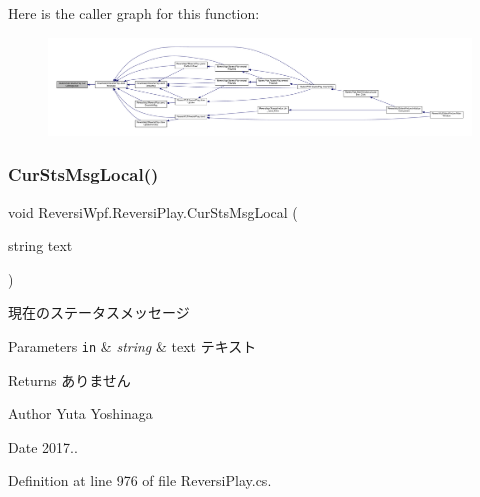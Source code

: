 Here is the caller graph for this function\+:
\nopagebreak
\begin{figure}[H]
\begin{center}
\leavevmode
\includegraphics[width=350pt]{class_reversi_wpf_1_1_reversi_play_a009e9476a5ca008b66093f78132bb096_icgraph}
\end{center}
\end{figure}
\mbox{\label{class_reversi_wpf_1_1_reversi_play_a3bf270db60f09d060120c0d85966e754}} 
\subsubsection{\texorpdfstring{Cur\+Sts\+Msg\+Local()}{CurStsMsgLocal()}}
{\footnotesize\ttfamily void Reversi\+Wpf.\+Reversi\+Play.\+Cur\+Sts\+Msg\+Local (\begin{DoxyParamCaption}\item[{string}]{text }\end{DoxyParamCaption})\hspace{0.3cm}{\ttfamily [private]}}



現在のステータスメッセージ 


\begin{DoxyParams}[1]{Parameters}
\mbox{\tt in}  & {\em string} & text テキスト \\
\hline
\end{DoxyParams}
\begin{DoxyReturn}{Returns}
ありません 
\end{DoxyReturn}
\begin{DoxyAuthor}{Author}
Yuta Yoshinaga 
\end{DoxyAuthor}
\begin{DoxyDate}{Date}
2017.. 
\end{DoxyDate}


Definition at line 976 of file Reversi\+Play.\+cs.



